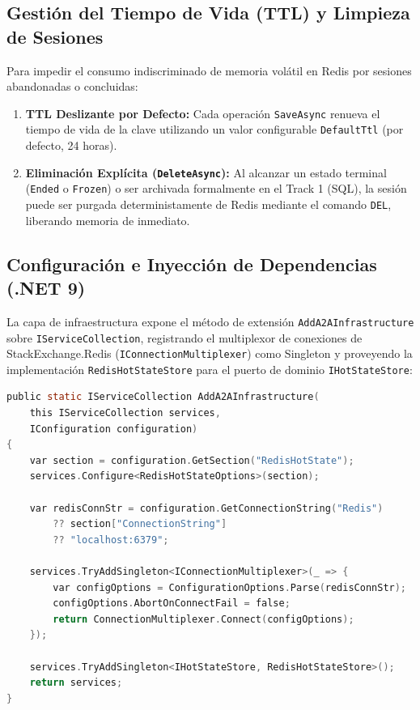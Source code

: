 \subsection{Gestión del Tiempo de Vida (TTL) y Limpieza de Sesiones}
Para impedir el consumo indiscriminado de memoria volátil en Redis por sesiones abandonadas o concluidas:
\begin{enumerate}
    \item \textbf{TTL Deslizante por Defecto:} Cada operación \texttt{SaveAsync} renueva el tiempo de vida de la clave utilizando un valor configurable \texttt{DefaultTtl} (por defecto, 24 horas).
    \item \textbf{Eliminación Explícita (\texttt{DeleteAsync}):} Al alcanzar un estado terminal (\texttt{Ended} o \texttt{Frozen}) o ser archivada formalmente en el Track 1 (SQL), la sesión puede ser purgada deterministamente de Redis mediante el comando \texttt{DEL}, liberando memoria de inmediato.
\end{enumerate}

\subsection{Configuración e Inyección de Dependencias (.NET 9)}
La capa de infraestructura expone el método de extensión \texttt{AddA2AInfrastructure} sobre \texttt{IServiceCollection}, registrando el multiplexor de conexiones de StackExchange.Redis (\texttt{IConnectionMultiplexer}) como Singleton y proveyendo la implementación \texttt{RedisHotStateStore} para el puerto de dominio \texttt{IHotStateStore}:

\begin{lstlisting}[language=C, caption={Configuración de Redis Infrastructure en ServiceCollectionExtensions.cs.}]
public static IServiceCollection AddA2AInfrastructure(
    this IServiceCollection services,
    IConfiguration configuration)
{
    var section = configuration.GetSection("RedisHotState");
    services.Configure<RedisHotStateOptions>(section);

    var redisConnStr = configuration.GetConnectionString("Redis")
        ?? section["ConnectionString"]
        ?? "localhost:6379";

    services.TryAddSingleton<IConnectionMultiplexer>(_ => {
        var configOptions = ConfigurationOptions.Parse(redisConnStr);
        configOptions.AbortOnConnectFail = false;
        return ConnectionMultiplexer.Connect(configOptions);
    });

    services.TryAddSingleton<IHotStateStore, RedisHotStateStore>();
    return services;
}
\end{lstlisting}
